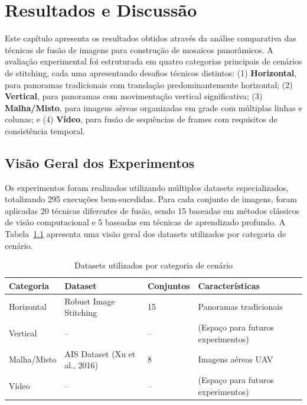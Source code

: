 \chapter{Resultados e Discussão}

Este capítulo apresenta os resultados obtidos através da análise comparativa das técnicas de fusão de imagens para construção de mosaicos panorâmicos. A avaliação experimental foi estruturada em quatro categorias principais de cenários de stitching, cada uma apresentando desafios técnicos distintos: (1) \textbf{Horizontal}, para panoramas tradicionais com translação predominantemente horizontal; (2) \textbf{Vertical}, para panoramas com movimentação vertical significativa; (3) \textbf{Malha/Misto}, para imagens aéreas organizadas em grade com múltiplas linhas e colunas; e (4) \textbf{Vídeo}, para fusão de sequências de frames com requisitos de consistência temporal.

\section{Visão Geral dos Experimentos}

Os experimentos foram realizados utilizando múltiplos datasets especializados, totalizando 295 execuções bem-sucedidas. Para cada conjunto de imagens, foram aplicadas 20 técnicas diferentes de fusão, sendo 15 baseadas em métodos clássicos de visão computacional e 5 baseadas em técnicas de aprendizado profundo. A Tabela~\ref{tab:datasets_overview} apresenta uma visão geral dos datasets utilizados por categoria de cenário.

\begin{table}[htb]
\centering
\caption{Datasets utilizados por categoria de cenário}
\label{tab:datasets_overview}
\small
\begin{tabular}{llll}
\hline
\textbf{Categoria} & \textbf{Dataset} & \textbf{Conjuntos} & \textbf{Características} \\ \hline
Horizontal & Robust Image Stitching & 15 & Panoramas tradicionais \\
Vertical & -- & -- & (Espaço para futuros experimentos) \\
Malha/Misto & AIS Dataset (Xu et al., 2016) & 8 & Imagens aéreas UAV \\
Vídeo & -- & -- & (Espaço para futuros experimentos) \\
\hline
\end{tabular}
\end{table}

